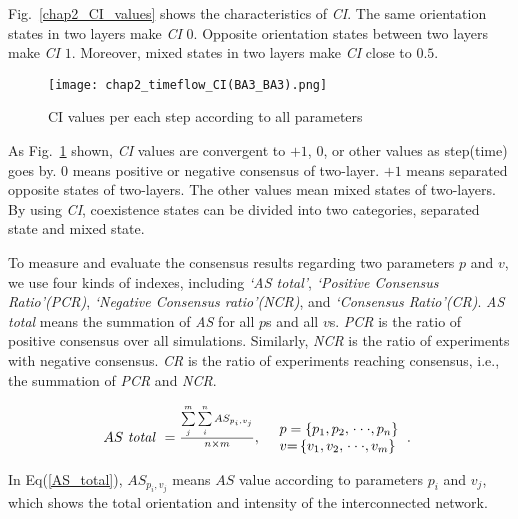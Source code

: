 Fig.~\ref{chap2_CI_values} shows the characteristics of \textit{CI}. The same orientation states in two layers make \textit{CI} $0$. Opposite orientation states between two layers make \textit{CI} $1$. Moreover, mixed states in two layers make \textit{CI} close to $0.5$.

\begin{figure}[!htb]
	\centering
	\texttt{[image: chap2\_timeflow\_CI(BA3\_BA3).png]}
	\caption{CI values per each step according to all parameters}
	\label{chap2_timeflow_CI(BA3_BA3)}
\end{figure}

As Fig.~\ref{chap2_timeflow_CI(BA3_BA3)} shown, \textit{CI} values are convergent to $+1$, $0$, or other values as step(time) goes by. $0$ means positive or negative consensus of two-layer. $+1$ means separated opposite states of two-layers. The other values mean mixed states of two-layers. By using \textit{CI}, coexistence states can be divided into two categories, separated state and mixed state. 

To measure and evaluate the consensus results regarding two parameters $p$ and $v$, we use four kinds of indexes, including \textit{`AS total'}, \textit{`Positive Consensus Ratio'(PCR)}, \textit{`Negative Consensus ratio'(NCR)}, and \textit{`Consensus Ratio'(CR)}. \textit{AS total} means the summation of \textit{AS} for all $p$s and all $v$s. \textit{PCR} is the ratio of positive consensus over all simulations. Similarly, \textit{NCR} is the ratio of experiments with negative consensus. \textit{CR} is the ratio of experiments reaching consensus, i.e., the summation of \textit{PCR} and \textit{NCR}.

\begin{equation}
\begin{array}{cl}
AS\mbox{ \textit{total} } = \frac{{\sum\limits_j^m {\sum\limits_i^n {A{S_{{p _i},{v _j}}}} } }}{{n \times m }}, &
\begin{array}{l}
p  = \left\{ {{p _{\rm{1}}},{p _{\rm{2}}},\left. {\cdot\cdot\cdot,{p _n}} \right\}} \right.\\
v {\rm{ = }}\left\{ {{v _{\rm{1}}},{v _{\rm{2}}},\left. {\cdot\cdot\cdot,{v _m}} \right\}} \right.
\end{array}.\
\end{array}
\label{AS_total}
\end{equation}

In Eq(\ref{AS_total}), ${A{S_{{p _i},{v _j}}}}$ means $AS$ value according to parameters $p_i$ and $v_j$, which shows the total orientation and intensity of the interconnected network.

